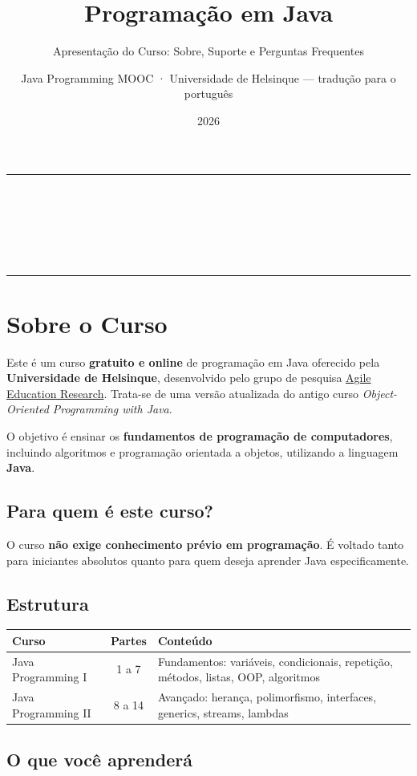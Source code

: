 \documentclass[11pt,a4paper]{article}
\title{Programação em Java}
\subtitle{Apresentação do Curso: Sobre, Suporte e Perguntas Frequentes}
\author{Java Programming MOOC · Universidade de Helsinque — tradução para o português}
\date{2026}
\makeatletter
\renewcommand{\maketitle}{%
  \begin{center}
    {\color{javaRule}\rule{\linewidth}{1pt}}\\[6pt]
    {\Huge\sffamily\bfseries\color{javaOrange} \@title}\\[6pt]
    \ifx\@subtitle\undefined\else
      {\Large\sffamily\color{javaDeep} \@subtitle}\\[4pt]
    \fi
    {\small\sffamily\color{gray} \@author}\\[2pt]
    {\small\sffamily\color{gray} \@date}\\[6pt]
    {\color{javaRule}\rule{\linewidth}{1pt}}
  \end{center}
  \vspace{1em}
}
\makeatother
\begin{document}
\maketitle
\tableofcontents
\vspace{1.5em}

\section{Sobre o Curso}

Este é um curso \textbf{gratuito e online} de programação em Java oferecido pela \textbf{Universidade de Helsinque}, desenvolvido pelo grupo de pesquisa \href{https://www.helsinki.fi/en/researchgroups/data-driven-education}{Agile Education Research}. Trata-se de uma versão atualizada do antigo curso \textit{Object-Oriented Programming with Java}.

O objetivo é ensinar os \textbf{fundamentos de programação de computadores}, incluindo algoritmos e programação orientada a objetos, utilizando a linguagem \textbf{Java}.

\subsection{Para quem é este curso?}

O curso \textbf{não exige conhecimento prévio em programação}. É voltado tanto para iniciantes absolutos quanto para quem deseja aprender Java especificamente.

\subsection{Estrutura}

\begin{center}
\begin{tabular}{l c p{8cm}}
\toprule
\textbf{Curso} & \textbf{Partes} & \textbf{Conteúdo} \\
\midrule
Java Programming I  & 1 a 7  & Fundamentos: variáveis, condicionais, repetição, métodos, listas, OOP, algoritmos \\
Java Programming II & 8 a 14 & Avançado: herança, polimorfismo, interfaces, generics, streams, lambdas \\
\bottomrule
\end{tabular}
\end{center}

\subsection{O que você aprenderá}
\end{document}
